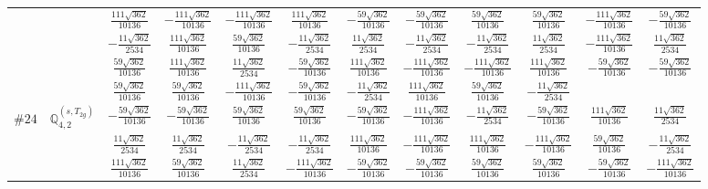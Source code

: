 \documentclass[fleqn,9pt,landscape]{jsarticle}
\begin{document}
\begin{center}
\begin{longtable}{lcccccccccc}
& $ \frac{111 \sqrt{362}}{10136} $ & $ - \frac{111 \sqrt{362}}{10136} $ & $ - \frac{111 \sqrt{362}}{10136} $ & $ \frac{111 \sqrt{362}}{10136} $ & $ - \frac{59 \sqrt{362}}{10136} $ & $ - \frac{59 \sqrt{362}}{10136} $ & $ \frac{59 \sqrt{362}}{10136} $ & $ \frac{59 \sqrt{362}}{10136} $ & $ - \frac{111 \sqrt{362}}{10136} $ & $ - \frac{59 \sqrt{362}}{10136} $ \\
& $ - \frac{11 \sqrt{362}}{2534} $ & $ \frac{111 \sqrt{362}}{10136} $ & $ \frac{59 \sqrt{362}}{10136} $ & $ - \frac{11 \sqrt{362}}{2534} $ & $ \frac{11 \sqrt{362}}{2534} $ & $ - \frac{11 \sqrt{362}}{2534} $ & $ - \frac{11 \sqrt{362}}{2534} $ & $ \frac{11 \sqrt{362}}{2534} $ & $ - \frac{111 \sqrt{362}}{10136} $ & $ \frac{11 \sqrt{362}}{2534} $ \\
& $ \frac{59 \sqrt{362}}{10136} $ & $ \frac{111 \sqrt{362}}{10136} $ & $ \frac{11 \sqrt{362}}{2534} $ & $ - \frac{59 \sqrt{362}}{10136} $ & $ \frac{111 \sqrt{362}}{10136} $ & $ - \frac{111 \sqrt{362}}{10136} $ & $ - \frac{111 \sqrt{362}}{10136} $ & $ \frac{111 \sqrt{362}}{10136} $ & $ - \frac{59 \sqrt{362}}{10136} $ & $ - \frac{59 \sqrt{362}}{10136} $ \\
& $ \frac{59 \sqrt{362}}{10136} $ & $ \frac{59 \sqrt{362}}{10136} $ & $ - \frac{111 \sqrt{362}}{10136} $ & $ - \frac{59 \sqrt{362}}{10136} $ & $ - \frac{11 \sqrt{362}}{2534} $ & $ \frac{111 \sqrt{362}}{10136} $ & $ \frac{59 \sqrt{362}}{10136} $ & $ - \frac{11 \sqrt{362}}{2534} $ & $  $ & $  $ \\ \hline
$ \#24\quad \mathbb{Q}_{4,2}^{(s,T_{2g})} $ & $ - \frac{59 \sqrt{362}}{10136} $ & $ - \frac{59 \sqrt{362}}{10136} $ & $ \frac{59 \sqrt{362}}{10136} $ & $ \frac{59 \sqrt{362}}{10136} $ & $ - \frac{59 \sqrt{362}}{10136} $ & $ - \frac{111 \sqrt{362}}{10136} $ & $ - \frac{11 \sqrt{362}}{2534} $ & $ - \frac{59 \sqrt{362}}{10136} $ & $ \frac{111 \sqrt{362}}{10136} $ & $ \frac{11 \sqrt{362}}{2534} $ \\
& $ \frac{11 \sqrt{362}}{2534} $ & $ \frac{11 \sqrt{362}}{2534} $ & $ - \frac{11 \sqrt{362}}{2534} $ & $ - \frac{11 \sqrt{362}}{2534} $ & $ \frac{111 \sqrt{362}}{10136} $ & $ - \frac{111 \sqrt{362}}{10136} $ & $ \frac{111 \sqrt{362}}{10136} $ & $ - \frac{111 \sqrt{362}}{10136} $ & $ \frac{59 \sqrt{362}}{10136} $ & $ - \frac{11 \sqrt{362}}{2534} $ \\
& $ \frac{111 \sqrt{362}}{10136} $ & $ \frac{59 \sqrt{362}}{10136} $ & $ \frac{11 \sqrt{362}}{2534} $ & $ - \frac{111 \sqrt{362}}{10136} $ & $ - \frac{59 \sqrt{362}}{10136} $ & $ - \frac{59 \sqrt{362}}{10136} $ & $ \frac{59 \sqrt{362}}{10136} $ & $ \frac{59 \sqrt{362}}{10136} $ & $ - \frac{59 \sqrt{362}}{10136} $ & $ - \frac{111 \sqrt{362}}{10136} $ \\

\end{longtable}
\end{center}
\end{document}
